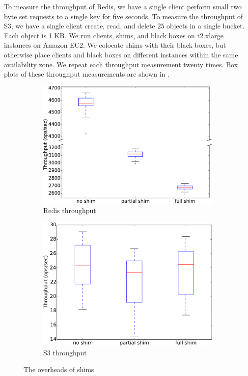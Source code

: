 To measure the throughput of Redis, we have a single client perform small two
byte set requests to a single key for five seconds. To measure the throughput
of S3, we have a single client create, read, and delete 25 objects in a single
bucket. Each object is 1 KB. We run clients, shims, and black boxes on
t2.xlarge instances on Amazon EC2. We colocate shims with their black boxes,
but otherwise place clients and black boxes on different instances within the
same availability zone. We repeat each throughput measurement twenty times.
Box plots of these throughput measurements are shown in .

\begin{figure}[t]
  \centering
  \begin{subfigure}[b]{\columnwidth}
    \centering
    \includegraphics[width=0.8\columnwidth]{figures/redis_shim.pdf}
    \caption{Redis throughput}
  \end{subfigure}

  \begin{subfigure}[b]{\columnwidth}
    \centering
    \includegraphics[width=0.8\columnwidth]{figures/s3_shim.pdf}
    \caption{S3 throughput}
  \end{subfigure}%
  \caption{The overheads of \fluent{} shims}
\end{figure}

